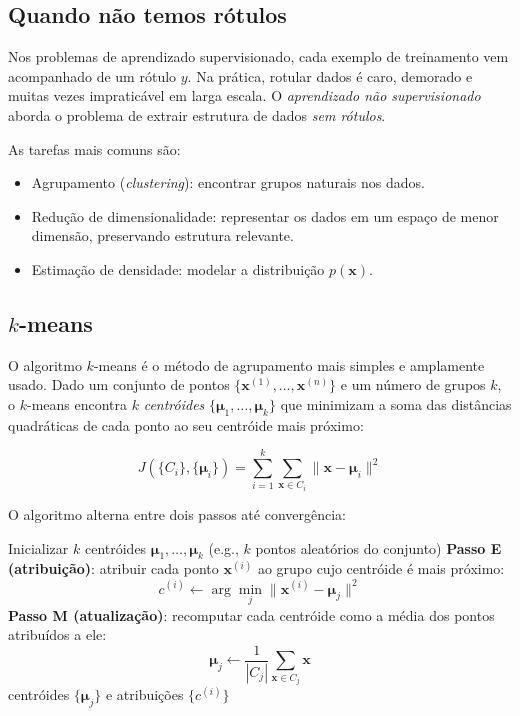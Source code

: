 \documentclass[12pt,a4paper]{article}
\begin{document}
\subsection{Quando não temos rótulos}
\label{subsec:nsup-intro}

Nos problemas de aprendizado supervisionado, cada exemplo de treinamento vem acompanhado de um rótulo $y$. Na prática, rotular dados é caro, demorado e muitas vezes impraticável em larga escala. O \emph{aprendizado não supervisionado} aborda o problema de extrair estrutura de dados \emph{sem rótulos}.

As tarefas mais comuns são:

\begin{itemize}
    \item Agrupamento (\textit{clustering}): encontrar grupos naturais nos dados.
    \item Redução de dimensionalidade: representar os dados em um espaço de menor dimensão, preservando estrutura relevante.
    \item Estimação de densidade: modelar a distribuição $p(\mathbf{x})$.
\end{itemize}

\subsection{\texorpdfstring{$k$}{k}-means}
\label{subsec:kmeans}

O algoritmo $k$-means é o método de agrupamento mais simples e amplamente usado. Dado um conjunto de pontos $\{\mathbf{x}^{(1)}, \ldots, \mathbf{x}^{(n)}\}$ e um número de grupos $k$, o $k$-means encontra $k$ \emph{centróides} $\{\boldsymbol{\mu}_1, \ldots, \boldsymbol{\mu}_k\}$ que minimizam a soma das distâncias quadráticas de cada ponto ao seu centróide mais próximo:

\[
J(\{C_i\}, \{\boldsymbol{\mu}_i\}) = \sum_{i=1}^k \sum_{\mathbf{x} \in C_i} \|\mathbf{x} - \boldsymbol{\mu}_i\|^2
\]

O algoritmo alterna entre dois passos até convergência:

\begin{algorithm}[htb]
\caption{$k$-means}
\begin{algorithmic}[1]
\STATE Inicializar $k$ centróides $\boldsymbol{\mu}_1, \ldots, \boldsymbol{\mu}_k$ (e.g., $k$ pontos aleatórios do conjunto)
\REPEAT
    \STATE \textbf{Passo E (atribuição)}: atribuir cada ponto $\mathbf{x}^{(i)}$ ao grupo cujo centróide é mais próximo:
    \[
    c^{(i)} \leftarrow \arg\min_j \|\mathbf{x}^{(i)} - \boldsymbol{\mu}_j\|^2
    \]
    \STATE \textbf{Passo M (atualização)}: recomputar cada centróide como a média dos pontos atribuídos a ele:
    \[
    \boldsymbol{\mu}_j \leftarrow \frac{1}{|C_j|} \sum_{\mathbf{x} \in C_j} \mathbf{x}
    \]
\RETURN centróides $\{\boldsymbol{\mu}_j\}$ e atribuições $\{c^{(i)}\}$
\end{algorithmic}
\label{alg:kmeans}
\end{algorithm}
\end{document}
